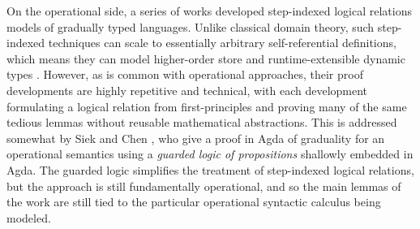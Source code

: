 

On the operational side, a series of works
\cite{new-ahmed2018, new-licata-ahmed2019, new-jamner-ahmed19}
developed step-indexed logical relations models of gradually typed languages.
Unlike classical domain theory, such step-indexed techniques can scale to
essentially arbitrary self-referential definitions, which means they can model
higher-order store and runtime-extensible dynamic types
\cite{appelmcallester01,ahmed06,neis09,new-jamner-ahmed19}. However, as is
common with operational approaches, their proof developments are highly
repetitive and technical, with each development formulating a logical relation
from first-principles and proving many of the same tedious lemmas without
reusable mathematical abstractions.
%
%
%
This is addressed somewhat by Siek and Chen \cite{siek-chen2021}, who give a
proof in Agda of graduality for an operational semantics using a \emph{guarded
logic of propositions} shallowly embedded in Agda. The guarded logic simplifies
the treatment of step-indexed logical relations, but the approach is still
fundamentally operational, and so the main lemmas of the work are still tied to
the particular operational syntactic calculus being modeled.

